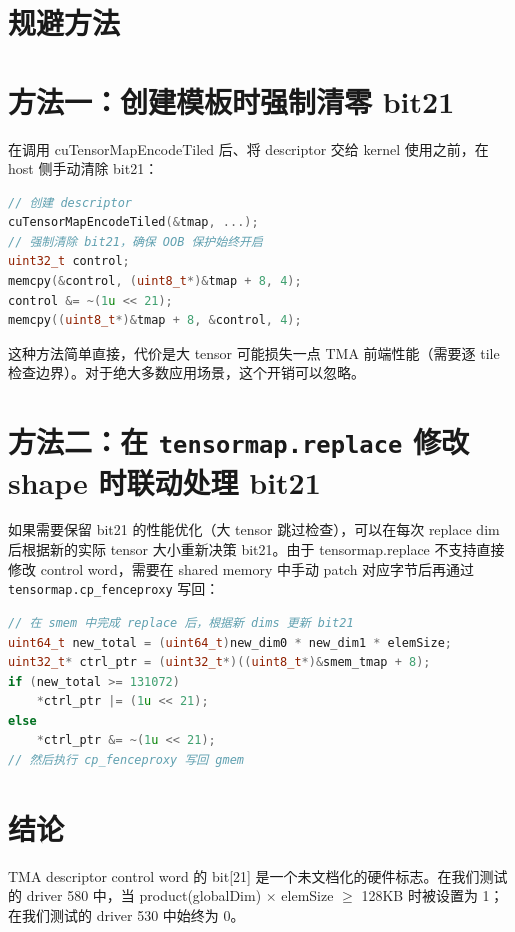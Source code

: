 \section{规避方法}

\section{方法一：创建模板时强制清零 bit21}

在调用 cuTensorMapEncodeTiled 后、将 descriptor 交给 kernel 使用之前，在 host 侧手动清除 bit21：

\begin{lstlisting}[language=C++]
// 创建 descriptor
cuTensorMapEncodeTiled(&tmap, ...);
// 强制清除 bit21，确保 OOB 保护始终开启
uint32_t control;
memcpy(&control, (uint8_t*)&tmap + 8, 4);
control &= ~(1u << 21);
memcpy((uint8_t*)&tmap + 8, &control, 4);
\end{lstlisting}

这种方法简单直接，代价是大 tensor 可能损失一点 TMA 前端性能（需要逐 tile 检查边界）。对于绝大多数应用场景，这个开销可以忽略。

\section{方法二：在 \texttt{tensormap.replace} 修改 shape 时联动处理 bit21}

如果需要保留 bit21 的性能优化（大 tensor 跳过检查），可以在每次 replace dim 后根据新的实际 tensor 大小重新决策 bit21。由于 tensormap.replace 不支持直接修改 control word，需要在 shared memory 中手动 patch 对应字节后再通过 \lstinline|tensormap.cp_fenceproxy| 写回：

\begin{lstlisting}[language=C++]
// 在 smem 中完成 replace 后，根据新 dims 更新 bit21
uint64_t new_total = (uint64_t)new_dim0 * new_dim1 * elemSize;
uint32_t* ctrl_ptr = (uint32_t*)((uint8_t*)&smem_tmap + 8);
if (new_total >= 131072)
    *ctrl_ptr |= (1u << 21);
else
    *ctrl_ptr &= ~(1u << 21);
// 然后执行 cp_fenceproxy 写回 gmem
\end{lstlisting}

\section{结论}

TMA descriptor control word 的 bit[21] 是一个未文档化的硬件标志。在我们测试的 driver 580 中，当 product(globalDim) $\times$ elemSize $\geq$ 128KB 时被设置为 1；在我们测试的 driver 530 中始终为 0。

